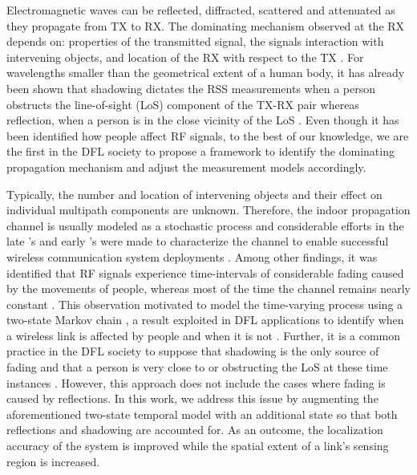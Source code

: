 \documentclass[journal, 10pt, twocolumn, balance]{IEEEtran}
\begin{document}
Electromagnetic waves can be reflected, diffracted, scattered and attenuated as they propagate from TX to RX. The dominating mechanism observed at the RX depends on: properties of the transmitted signal, the signals interaction with intervening objects, and location of the RX with respect to the TX \cite[Ch. 4]{Molisch2010}. For wavelengths smaller than the geometrical extent of a human body, it has already been shown that shadowing dictates the RSS measurements when a person obstructs the line-of-sight (LoS) component of the TX-RX pair \cite{patwari08} whereas reflection, when a person is in the close vicinity of the LoS \cite{patwari2011b}. Even though it has been identified how people affect RF signals, to the best of our knowledge, we are the first in the DFL society to propose a framework to identify the dominating propagation mechanism and adjust the measurement models accordingly.

Typically, the number and location of intervening objects and their effect on individual multipath components are unknown. Therefore, the indoor propagation channel is usually modeled as a stochastic process \cite[Ch. 5]{Molisch2010} and considerable efforts in the late 's and early 's were made to characterize the channel to enable successful wireless communication system deployments \cite{hashemi93}. Among other findings, it was identified that RF signals experience time-intervals of considerable fading caused by the movements of people, whereas most of the time the channel remains nearly constant \cite{bultitude1987, hashemi94}. This observation motivated to model the time-varying process using a two-state Markov chain \cite{roberts1995}, a result exploited in DFL applications to identify when a wireless link is affected by people and when it is not \cite{Wilson2012, Zheng2012}. Further, it is a common practice in the DFL society to suppose that shadowing is the only source of fading and that a person is very close to or obstructing the LoS at these time instances \cite{Wilson2010,li2011,Kaltiokallio2012}. However, this approach does not include the cases where fading is caused by reflections. In this work, we address this issue by augmenting the aforementioned two-state temporal model with an additional state so that both reflections and shadowing are accounted for. As an outcome, the localization accuracy of the system is improved while the spatial extent of a link's sensing region is increased.
\end{document}
